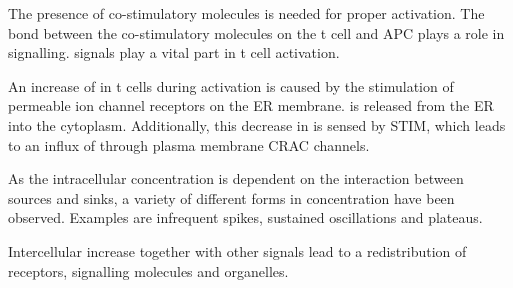 The presence of co-stimulatory molecules is needed for proper activation. The bond between the co-stimulatory molecules on the t cell and APC plays a role in signalling. \Calcium signals play a vital part in t cell activation.

An increase of \Calcium in t cells during activation is caused by the stimulation of \Calcium permeable ion channel receptors on the ER membrane. \Calcium is released from the ER into the cytoplasm. Additionally, this decrease in \Calcium is sensed by STIM, which leads to an influx of \Calcium through plasma membrane CRAC channels.\cite{smith2009}

As the intracellular \Calcium concentration is dependent on the interaction between \Calcium sources and sinks, a variety of different forms in \Calcium concentration have been observed. Examples are infrequent spikes, sustained oscillations and plateaus.\cite{Lewis2001}

Intercellular \Calcium increase together with other signals lead to a redistribution of receptors, signalling molecules and organelles.\cite{joseph2014}